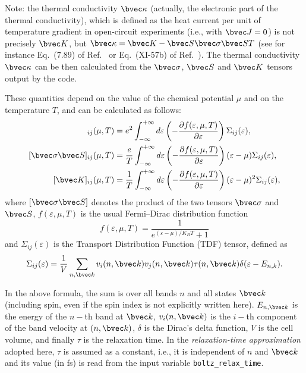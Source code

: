 Note: the thermal conductivity $\bvec \kappa$ (actually, the electronic part of the thermal conductivity), which is defined as the heat current per unit of temperature gradient in open-circuit experiments (i.e., with $\bvec J=0$) is not precisely $\bvec K$, but  $\bvec\kappa = \bvec K-\bvec S \bvec \sigma \bvec S T$ (see for instance Eq.~(7.89) of Ref.~\cite{ziman-book72} or Eq.~(XI-57b) of Ref.~\cite{grosso-book00}).
The thermal conductivity $\bvec \kappa$ can be then calculated from the $\bvec \sigma$, $\bvec S$ and $\bvec K$ tensors output by the code.

These quantities depend on the value of the chemical potential $\mu$ and on the temperature $T$, and can be calculated as follows:
\begin{align}
  [\bvec \sigma]_{ij}(\mu,T)&=e^2 \int_{-\infty}^{+\infty} d\varepsilon \left(-\frac {\partial f(\varepsilon,\mu,T)}{\partial \varepsilon}\right)\Sigma_{ij}(\varepsilon), \\
  [\bvec \sigma \bvec S]_{ij}(\mu,T)&=\frac e T \int_{-\infty}^{+\infty} d\varepsilon \left(-\frac {\partial f(\varepsilon,\mu,T)}{\partial \varepsilon}\right)(\varepsilon-\mu)\Sigma_{ij}(\varepsilon), \label{eq:boltz-sigmas}\\
  [\bvec K]_{ij}(\mu,T)&=\frac 1 T \int_{-\infty}^{+\infty} d\varepsilon \left(-\frac {\partial f(\varepsilon,\mu,T)}{\partial \varepsilon}\right)(\varepsilon-\mu)^2 \Sigma_{ij}(\varepsilon),\label{eq:boltz-thermcond}
\end{align}
where $[\bvec \sigma \bvec S]$ denotes the product of the two tensors $\bvec \sigma$ and $\bvec S$, $f(\varepsilon,\mu,T)$ is the usual Fermi--Dirac distribution function 
\begin{equation*}
  f(\varepsilon,\mu,T) = \frac{1}{e^{(\varepsilon-\mu)/K_B T}+1}
\end{equation*}
and $\Sigma_{ij}(\varepsilon)$ is the Transport Distribution Function (TDF) tensor, defined as
\begin{equation*}
  \Sigma_{ij}(\varepsilon) = \frac 1 V \sum_{n,\bvec k} v_i(n,\bvec k) v_j(n,\bvec k) \tau(n,\bvec k) \delta(\varepsilon - E_{n,k}).
\end{equation*}

In the above formula, the sum is over all bands $n$ and all states $\bvec k$ (including spin, even if the spin index is not explicitly written here). $E_{n,\bvec k}$ is the energy of the $n-$th band at $\bvec k$, $v_i(n,\bvec k)$ is the $i-$th component of the band velocity at $(n,\bvec k)$, $\delta$ is the Dirac's delta function, $V$ is the cell volume, and finally $\tau$ is the relaxation time. In the \emph{relaxation-time approximation} adopted here, $\tau$ is assumed as a constant, i.e., it is independent of $n$ and $\bvec k$ and its value (in fs) is read from the input variable \verb#boltz_relax_time#.

